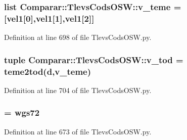 \subsubsection[{v\-\_\-teme}]{\setlength{\rightskip}{0pt plus 5cm}list {\bf \-Comparar\-::\-Tlevs\-Cods\-O\-S\-W\-::v\-\_\-teme} = [vel1[0],vel1[1],vel1[2]]}\label{namespace_comparar_1_1_tlevs_cods_o_s_w_af56ebdde98c2102a1cda5e1d0fcade44}


\-Definition at line 698 of file \-Tlevs\-Cods\-O\-S\-W.\-py.

\subsubsection[{v\-\_\-tod}]{\setlength{\rightskip}{0pt plus 5cm}tuple {\bf \-Comparar\-::\-Tlevs\-Cods\-O\-S\-W\-::v\-\_\-tod} = teme2tod({\bf d},{\bf v\-\_\-teme})}\label{namespace_comparar_1_1_tlevs_cods_o_s_w_a67fcf7e0e6ea8441d0bfa8f52c7f99a6}


\-Definition at line 704 of file \-Tlevs\-Cods\-O\-S\-W.\-py.

\subsubsection[{whichconst}]{ = wgs72}\label{namespace_comparar_1_1_tlevs_cods_o_s_w_a2f263feac66e6a83750b5d6eeebc4141}


\-Definition at line 673 of file \-Tlevs\-Cods\-O\-S\-W.\-py.

